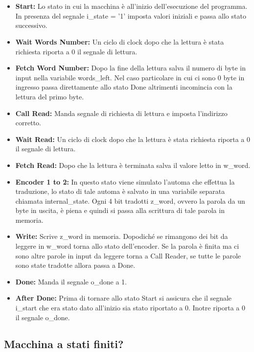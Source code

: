 \documentclass{article}
\begin{document}
\\
\\
\begin{itemize}
	\item \textbf{Start:} Lo stato in cui la macchina è all'inizio dell'esecuzione del programma. In presenza del segnale i\_state = '1' imposta valori iniziali e passa allo stato successivo.
	\item \textbf{Wait Words Number:} Un ciclo di clock dopo che la lettura è stata richiesta riporta a 0 il segnale di lettura.
	\item \textbf{Fetch Word Number:} Dopo la fine della lettura salva il numero di byte in input nella variabile words\_left. Nel caso particolare in cui ci sono 0 byte in ingresso passa direttamente allo stato Done altrimenti incomincia con la lettura del primo byte.
	\item \textbf{Call Read:} Manda segnale di richiesta di lettura e imposta l'indirizzo corretto.
	\item \textbf{Wait Read:} Un ciclo di clock dopo che la lettura è stata richiesta riporta a 0 il segnale di lettura.
	\item \textbf{Fetch Read:} Dopo che la lettura è terminata salva il valore letto in w\_word.
	\item \textbf{Encoder 1 to 2:} In questo stato viene simulato l'automa che effettua la traduzione, lo stato di tale automa è salvato in una variabile separata chiamata internal\_state. Ogni 4 bit tradotti z\_word, ovvero la parola da un byte in uscita, è piena e quindi si passa alla scrittura di tale parola in memoria.
	\item \textbf{Write:} Scrive z\_word in memoria. Dopodiché se rimangono dei bit da leggere in w\_word torna allo stato dell'encoder. Se la parola è finita ma ci sono altre parole in input da leggere torna a Call Reader, se tutte le parole sono state tradotte allora passa a Done.
	\item \textbf{Done:} Manda il segnale o\_done a 1.
	\item \textbf{After Done:} Prima di tornare allo stato Start si assicura che il segnale i\_start che era stato dato all'inizio sia stato riportato a 0. Inotre riporta a 0 il segnale o\_done.
\end{itemize}



\subsection{Macchina a stati finiti?}
\end{document}
